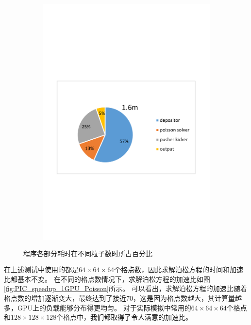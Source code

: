 \begin{figure}[!htb]
\begin{subfigure}[b]{0.75\textwidth}
        \includegraphics[width=\textwidth]{Img/PIC_speedup_1GPU_percentage3.pdf}
    \end{subfigure}
    \caption{程序各部分耗时在不同粒子数时所占百分比}\label{fig:PIC_speedup_1GPU_percentage}
\end{figure}

在上述测试中使用的都是$64 \times 64 \times 64$个格点数，因此求解泊松方程的时间和加速比都基本不变。
在不同的格点数情况下，求解泊松方程的加速比如图\ref{fig:PIC_speedup_1GPU_Poisson}所示。
可以看出，求解泊松方程的加速比随着格点数的增加逐渐变大，最终达到了接近70，这是因为格点数越大，其计算量越多，GPU上的负载能够分布得更均匀。
对于实际模拟中常用的$64 \times 64 \times 64$个格点和$128 \times 128 \times 128$个格点中，我们都取得了令人满意的加速比。

